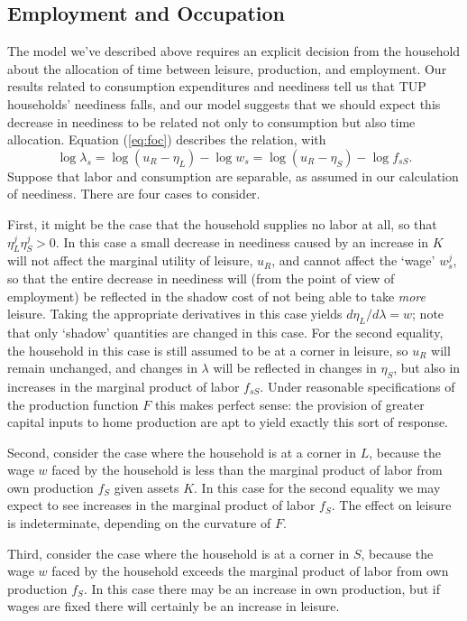 \documentclass[12pt,letterpaper]{article}
\newcommand{\Eq}[1]{(\ref{eq:#1})}
\begin{document}
\subsection{Employment and Occupation}
\label{sec:orgheadline17}

The model we've described above requires an explicit decision from the
household about the allocation of time between leisure, production,
and employment.  Our results related to consumption expenditures and
neediness tell us that TUP households' neediness falls, and our model
suggests that we should expect this decrease in neediness to be
related not only to consumption but also time allocation.
Equation \Eq{foc} describes the relation, with
\[
   \log\lambda_s = \log (u_R - \eta_L) - \log w_s = \log (u_R - \eta_S) - \log f_{sS}.
\]
Suppose that labor and consumption are separable, as assumed in our
calculation of neediness.  There are four cases to consider.  

First, it might be the case that the household supplies no labor at
all, so that \(\eta^j_L\eta^j_S>0\).  In this case a small decrease in
neediness caused by an increase in \(K\) will not affect the marginal
utility of leisure, \(u_R\), and cannot affect the `wage' \(w^j_s\), so
that the entire decrease in neediness will (from the point of view of
employment) be reflected in the shadow cost of not being able to take
\emph{more} leisure.  Taking the appropriate derivatives in this case
yields \(d\eta_L/d\lambda=w\); note that only `shadow' quantities are
changed in this case.  For the second equality, the household in this
case is still assumed to be at a corner in leisure, so \(u_R\) will
remain unchanged, and changes in \(\lambda\) will be reflected in
changes in \(\eta_S\), but also in increases in the marginal product of
labor \(f_{sS}\).  Under reasonable specifications of the production
function \(F\) this makes perfect sense: the provision of greater
capital inputs to home production are apt to yield exactly this
sort of response.

Second, consider the case where the household is at a corner in \(L\),
because the wage \(w\) faced by the household is less than the marginal
product of labor from own production \(f_S\) given assets \(K\).  In this
case for the second equality we may expect to see increases 
in the marginal product of labor \(f_S\).  The effect on leisure is
indeterminate, depending on the curvature of \(F\).

Third, consider the case where the household is at a corner in \(S\),
because the wage \(w\) faced by the household exceeds the marginal
product of labor from own production \(f_S\).  In this case there may be
an increase in own production, but if wages are fixed there will
certainly be an increase in leisure.
\end{document}
